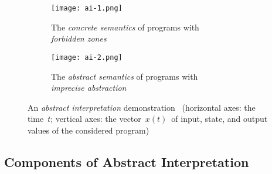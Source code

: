 \begin{figure}[hbt]
    \centering

    \begin{subfigure}[hbt]{.49 \linewidth}
        \centering
        \texttt{[image: ai-1.png]}
        \caption{The \emph{concrete semantics} of programs with \\ \emph{forbidden zones}}
        \label{fig:ai1}
    \end{subfigure}
%
    \hfill
%
    \begin{subfigure}[hbt]{.49 \linewidth}
        \centering
        \texttt{[image: ai-2.png]}
        \caption{The \emph{abstract semantics} of programs with \\ \emph{imprecise abstraction}}
        \label{fig:ai2}
    \end{subfigure}

    \caption{An \emph{abstract interpretation} demonstration~\cite{AIInNutshellCousot} (horizontal axes: the time~$ t $; vertical axes: the vector~$ x(t) $~of input, state, and output values of the considered program)}
\end{figure}

\subsection{Components of Abstract Interpretation}
\label{sec:AIComponents}

